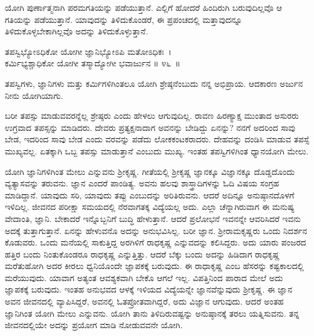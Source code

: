 ಯೋಗಿ ಪುರ್ಣಾತ್ಮನಾಗಿ ಪರಮಗತಿಯನ್ನು ಪಡೆಯುತ್ತಾನೆ. ಎಲ್ಲಿಗೆ ಹೋದರೆ ಹಿಂದಿರುಗಿ ಬರುವುದಿಲ್ಲವೊ ಆ ಗತಿಯನ್ನು ಪಡೆಯುತ್ತಾನೆ. ಯಾವುದನ್ನು ತಿಳಿದುಕೊಂಡರೆ, ಈ ಪ್ರಪಂಚದಲ್ಲಿ ಮತ್ತಾವುದನ್ನೂ ತಿಳಿದುಕೊಳ್ಳಬೇಕಾಗಿಲ್ಲವೊ ಅದನ್ನು ತಿಳಿದುಕೊಳ್ಳುತ್ತಾನೆ.

\begin{shloka}
ತಪಸ್ವಿಭ್ಯೋಽಧಿಕೋ ಯೋಗೀ ಜ್ಞಾನಿಭ್ಯೋಽಪಿ ಮತೋಽಧಿಕಃ~।\\ಕರ್ಮಿಭ್ಯಶ್ಚಾಧಿಕೋ ಯೋಗೀ ತಸ್ಮಾದ್ಯೋಗೀ ಭವಾರ್ಜುನ \hfill॥ ೪೬~॥
\end{shloka}

\begin{artha}
ತಪಸ್ವಿಗಳು, ಜ್ಞಾನಿಗಳು ಮತ್ತು ಕರ್ಮಿಗಳಿಗಿಂತಲೂ ಯೋಗಿ ಶ್ರೇಷ್ಠನೆಂಬುದು ನನ್ನ ಅಭಿಪ್ರಾಯ. ಆದಕಾರಣ ಅರ್ಜುನ ನೀನು ಯೋಗಿಯಾಗು.
\end{artha}

ಬರೀ ತಪಸ್ಸು ಮಾಡುವವರನ್ನೆಲ್ಲ ಶ್ರೇಷ್ಠರು ಎಂದು ಹೇಳಲು ಆಗುವುದಿಲ್ಲ. ರಾವಣ ಹಿರಣ್ಯಾಕ್ಷ ಮುಂತಾದ ಅಸುರರು ಉಗ್ರವಾದ ತಪಸ್ಸನ್ನು ಮಾಡಿದರು. ದೇವರು ಪ್ರತ್ಯಕ್ಷನಾದಾಗ ಅವನನ್ನು ಬೇಡಿದ್ದು ಏನನ್ನು? ನನಗೆ ಅದರಿಂದ ಸಾವು ಬೇಡ, ಇದರಿಂದ ಸಾವು ಬೇಡ ಎಂದು ವರವನ್ನು ಪಡೆದು ಲೋಕಕಂಟಕರಾದರು. ದೇಹವನ್ನು ದಂಡಿಸಿ ಮಾಡುವ ತಪಸ್ಸೆ ಮುಖ್ಯವಲ್ಲ. ಏತಕ್ಕಾಗಿ ಒಬ್ಬ ತಪಸ್ಸು ಮಾಡುತ್ತಾನೆ ಎಂಬುದು ಮುಖ್ಯ. ಇಂತಹ ತಪಸ್ವಿಗಳಿಗಿಂತ ಧ್ಯಾನಯೋಗಿ ಮೇಲು.

ಯೋಗಿ ಜ್ಞಾನಿಗಳಿಗಿಂತ ಮೇಲು ಎನ್ನುವನು ಶ‍್ರೀಕೃಷ್ಣ. ಗೀತೆಯಲ್ಲಿ ಶ‍್ರೀಕೃಷ್ಣ ಜ್ಞಾನಕ್ಕೂ ವಿಜ್ಞಾನಕ್ಕೂ ದೊಡ್ಡದೊಂದು ವ್ಯತ್ಯಾಸವನ್ನು ತರುವನು. ಜ್ಞಾನ ಎಂದರೆ ಪಾಂಡಿತ್ಯ. ಅವನು ಹಲವು ಶಾಸ್ತ್ರಾದಿಗಳನ್ನು ಓದಿ ವಿಷಯ ಸಂಗ್ರಹ ಮಾಡಿದ್ದಾನೆ. ಯಾವುದು ಸರಿ, ಯಾವುದು ತಪ್ಪು ಎಂಬುದನ್ನು ಅರಿತಿರುವನು. ಆದರೆ ಅದಿನ್ನೂ ಅನುಷ್ಠಾನದೊಳಗೆ ಇಳಿದಿಲ್ಲ. ಜೀವನದ ಪರೀಕ್ಷಾ ಸಮಯದಲ್ಲಿ ನೆರವಾಗತಕ್ಕ ವಿದ್ಯೆಯಲ್ಲ ಅದು. ಎಲ್ಲಾ ಚೆನ್ನಾಗಿರುವಾಗ ಈ ಮನುಷ್ಯ ವೇದಾಂತಿ, ಜ್ಞಾನಿ. ಬೇಕಾದರೆ ಇನ್ನೊಬ್ಬನಿಗೆ ಬುದ್ಧಿ ಹೇಳುತ್ತಾನೆ. ಆದರೆ ಪ್ರಲೋಭನೆ ಇವನನ್ನೇ ಆವರಿಸಿದರೆ ಇವನು ಅದಕ್ಕೆ ತುತ್ತಾಗುತ್ತಾನೆ. ಏನನ್ನು ಹೇಳುವನೊ ಅದನ್ನು ಅನುಭವಿಸಿಲ್ಲ. ಬರೀ ಜ್ಞಾನ. ಶ‍್ರೀರಾಮಕೃಷ್ಣರು ಒಂದು ನಿದರ್ಶನ ಕೊಡುವರು. ಒಂದು ಮನೆಯಲ್ಲಿ ಸಾಕುತ್ತಿದ್ದ ಅರಗಿಳಿಗೆ ರಾಧಕೃಷ್ಣ ಎನ್ನುವದನ್ನು ಕಲಿಸಿದ್ದರು. ಅದು ಯಾರು ಪಂಜರದ ಹತ್ತಿರ ಬಂದು ನಿಂತುಕೊಂಡರೂ ರಾಧಕೃಷ್ಣ ಎನ್ನುತ್ತಿತ್ತು. ಆದರೆ ಬೆಕ್ಕು ಬಂದು ಅದನ್ನು ಹಿಡಿದಾಗ ರಾಧಕೃಷ್ಣ ಮರೆತುಹೋಗಿ ಅದರ ಕೀರಲು ಧ್ವನಿಯೊಂದೇ ಜ್ಞಾಪಕಕ್ಕೆ ಬರುವುದು. ಈ ರಾಧಾಕೃಷ್ಣ ಎಂಬ ಹೆಸರನ್ನು ಕಷ್ಟಕಾಲದಲ್ಲಿ ಮರೆಯುವುದು. ಯಾವಾಗ ಅತ್ಯಂತ ಆವಶ್ಯಕವಾಗಿ ಬೇಕೊ ಆಗಲೆ ಇಲ್ಲ. ವಿಪತ್ತಿನಿಂದ ಪಾರಾದ ಮೇಲೆ ಅದು ಜ್ಞಾಪಕಕ್ಕೆ ಬರುವುದು. ಇಂತಹ ಅನುಭವದ ಆಳಕ್ಕೆ ಇಳಿಯದ ವಿದ್ಯೆಯನ್ನೇ ಜ್ಞಾನವೆನ್ನುವುದು ಶ‍್ರೀಕೃಷ್ಣ. ಈ ಜ್ಞಾನ ಅವನ ಜೀವನದಲ್ಲಿ ವ್ಯಾಪಿಸಿದ್ದರೆ, ಅವನಲ್ಲಿ ಓತಪ್ರೋತವಾಗಿದ್ದರೆ, ಅದು ವಿಜ್ಞಾನ ಆಗುವುದು. ಆದರೆ ಅಂತಹ ಜ್ಞಾನಿಗಿಂತ ಯೋಗಿ ಮೇಲು ಎನ್ನುವನು. ಯೋಗಿ ತಾನು ತಿಳಿದಿರುವಷ್ಟನ್ನು ಅನುಷ್ಠಾನಕ್ಕೆ ತರಲು ಯತ್ನಿಸುವನು. ತನ್ನ ಜೀವನದಲ್ಲಿಯೇ ಅದನ್ನು ಪ್ರಯೋಗ ಮಾಡಿ ನೋಡುವವನೇ ಯೋಗಿ.

